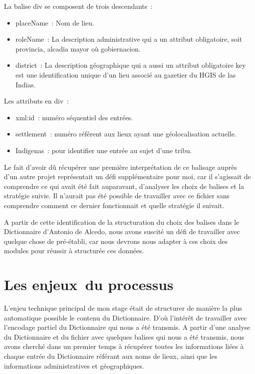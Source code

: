 \documentclass[a4paper,12pt,twoside]{book}
\begin{document}
	
La balise div se composent de trois descendants :\\

\begin{itemize}
    \item placeName : Nom de lieu.\\
    \item roleName : La description administrative qui a un attribut obligatoire, soit provincia, alcadia mayor où gobiernacion.\\
    \item district : La description géographique qui a aussi un attribut obligatoire key est une identification unique d’un lieu associé au gazetier du \Gls{HGIS de las Indias}.\\

\end{itemize}

Les attributs en div :\\
\begin{itemize}
   \item xml:id : numéro séquentiel des entrées.\\
    \item settlement : numéro référent aux lieux ayant une géolocalisation actuelle.\\
    \item Indigenas : pour identifier une entrée au sujet d’une tribu.\\
\end{itemize}

Le fait d’avoir dû récupérer une première interprétation de ce balisage auprès d’un autre projet représentait un défi supplémentaire pour moi, car il s’agissait de comprendre ce qui avait été fait auparavant, d’analyser les choix de balises et la stratégie suivie. Il n’aurait pas été possible de travailler avec ce fichier sans comprendre comment ce dernier fonctionnait et quelle stratégie il suivait. 

A partir de cette identification de la structuration du choix des balises dans le Dictionnaire d’Antonio de Alcedo, nous avons suscité un défi de travailler avec quelque chose de pré-établi, car nous devrons nous adapter à ces choix des modules pour réussir à structurée ces données.
	
	
\section{Les enjeux du processus}

L’enjeu technique principal de mon stage était  de structurer de manière la plus automatique possible le contenu du Dictionnaire. D’où l’intérêt de travailler avec l’encodage partiel du Dictionnaire qui nous a été transmis. A partir d’une analyse du Dictionnaire et du fichier avec quelques balises qui nous a été transmis, nous avons cherché dans un premier temps à récupérer toutes les informations liées à chaque entrée du Dictionnaire référant aux noms de lieux, ainsi que les informations administratives et géographiques. 
\end{document}
